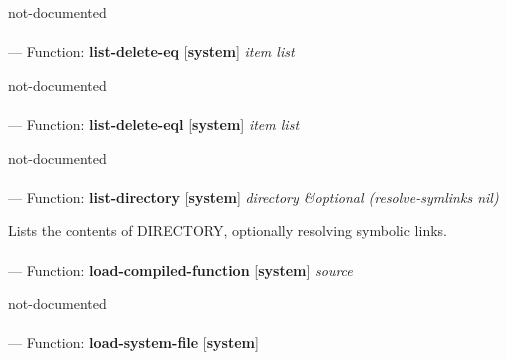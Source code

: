 \begin{adjustwidth}{5em}{5em}
not-documented
\end{adjustwidth}

\paragraph{}
\label{SYSTEM:LIST-DELETE-EQ}
--- Function: \textbf{list-delete-eq} [\textbf{system}] \textit{item list}

\begin{adjustwidth}{5em}{5em}
not-documented
\end{adjustwidth}

\paragraph{}
\label{SYSTEM:LIST-DELETE-EQL}
--- Function: \textbf{list-delete-eql} [\textbf{system}] \textit{item list}

\begin{adjustwidth}{5em}{5em}
not-documented
\end{adjustwidth}

\paragraph{}
\label{SYSTEM:LIST-DIRECTORY}
--- Function: \textbf{list-directory} [\textbf{system}] \textit{directory \&optional (resolve-symlinks nil)}

\begin{adjustwidth}{5em}{5em}
Lists the contents of DIRECTORY, optionally resolving symbolic links.
\end{adjustwidth}

\paragraph{}
\label{SYSTEM:LOAD-COMPILED-FUNCTION}
--- Function: \textbf{load-compiled-function} [\textbf{system}] \textit{source}

\begin{adjustwidth}{5em}{5em}
not-documented
\end{adjustwidth}

\paragraph{}
\label{SYSTEM:LOAD-SYSTEM-FILE}
--- Function: \textbf{load-system-file} [\textbf{system}] \textit{}

